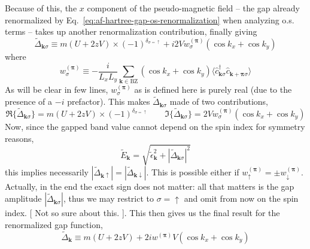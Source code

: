 Because of this, the $x$ component of the pseudo-magnetic field -- the gap already renormalized by Eq.~\eqref{eq:af-hartree-gap-os-renormalization} when analyzing o.s. terms -- takes up another renormalization contribution, finally giving
\begin{equation}\label{eq:af-fock-gap-ss-renormalization-intermediate}
	\tilde{\Delta}_{\mathbf{k}\sigma} \equiv m(U + 2zV) \times (-1)^{\delta_{\sigma=\uparrow}} + i2V w_\sigma^{(\bm{\pi})} \left(
		\cos k_x + \cos	k_y	
	\right)
\end{equation}
where
\[
	w_\sigma^{(\bm{\pi})} \equiv -\frac{i}{L_xL_y} \sum_{\mathbf{k}\in\mathrm{BZ}}
	\left(
		\cos k_x + \cos k_y
	\right) \langle
		\hat c_{\mathbf{k}\sigma}^\dagger  \hat c_{\mathbf{k}+\bm{\pi}\sigma}
	\rangle
\]
As will be clear in few lines, $w_\sigma^{(\bm{\pi})}$ as is defined here is purely real (due to the presence of a $-i$ prefactor). This makes $\tilde{\Delta}_{\mathbf{k}\sigma}$ made of two contributions,
\[
	\Re\{\tilde{\Delta}_{\mathbf{k}\sigma}\} = m(U + 2zV) \times (-1)^{\delta_{\sigma=\uparrow}}
	\qquad
	\Im\{\tilde{\Delta}_{\mathbf{k}\sigma}\} = 2V w_\sigma^{(\bm{\pi})} \left(
	\cos k_x + \cos	k_y	
	\right)
\]
Now, since the gapped band value cannot depend on the spin index for symmetry reasons,
\[
	\tilde{E}_\mathbf{k} = \sqrt{
		\tilde{\epsilon}_\mathbf{k}^2 + |\tilde{\Delta}_{\mathbf{k}\sigma}|^2
	}
\]
this implies necessarily $|\tilde{\Delta}_{\mathbf{k}\uparrow}| = |\tilde{\Delta}_{\mathbf{k}\downarrow}|$. This is possible either if $w_\uparrow^{(\bm{\pi})} = \pm w_\downarrow^{(\bm{\pi})}$. Actually, in the end the exact sign does not matter: all that matters is the gap amplitude $|\tilde{\Delta}_{\mathbf{k}\sigma}|$, thus we may restrict to $\sigma=\uparrow$ and omit from now on the spin index. {\color{tabred}[
	Not so sure about this.	
]}. This then gives us the final result for the renormalized gap function,
\begin{equation}\label{eq:af-fock-gap-ss-renormalization}
	\tilde{\Delta}_\mathbf{k} \equiv
		m(U + 2zV) + 2iw^{(\bm{\pi})}V
	\left(
		\cos k_x + \cos	k_y	
	\right)
\end{equation}
